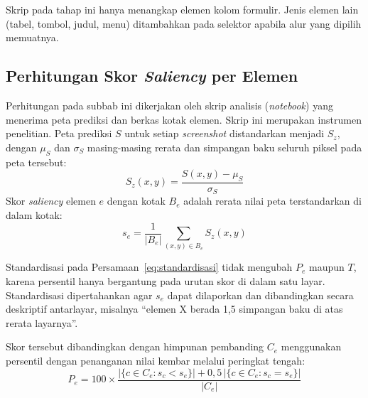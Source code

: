 Skrip pada tahap ini hanya menangkap elemen kolom formulir. Jenis elemen lain (tabel, tombol, judul, menu) ditambahkan pada selektor apabila alur yang dipilih memuatnya.

\subsection{Perhitungan Skor \emph{Saliency} per Elemen}
\label{subsec:skor}

Perhitungan pada subbab ini dikerjakan oleh skrip analisis (\emph{notebook}) yang menerima peta prediksi dan berkas kotak elemen. Skrip ini merupakan instrumen penelitian. Peta prediksi $S$ untuk setiap \emph{screenshot} distandarkan menjadi $S_z$, dengan $\mu_S$ dan $\sigma_S$ masing-masing rerata dan simpangan baku seluruh piksel pada peta tersebut:
\begin{equation}
  S_z(x,y) = \frac{S(x,y) - \mu_S}{\sigma_S}
  \label{eq:standardisasi}
\end{equation}
Skor \emph{saliency} elemen $e$ dengan kotak $B_e$ adalah rerata nilai peta terstandarkan di dalam kotak:
\begin{equation}
  s_e = \frac{1}{|B_e|}\sum_{(x,y)\in B_e} S_z(x,y)
  \label{eq:skor}
\end{equation}

Standardisasi pada Persamaan~\eqref{eq:standardisasi} tidak mengubah $P_e$ maupun $T$, karena persentil hanya bergantung pada urutan skor di dalam satu layar. Standardisasi dipertahankan agar $s_e$ dapat dilaporkan dan dibandingkan secara deskriptif antarlayar, misalnya ``elemen X berada 1,5 simpangan baku di atas rerata layarnya''.

Skor tersebut dibandingkan dengan himpunan pembanding $C_e$ menggunakan persentil dengan penanganan nilai kembar melalui peringkat tengah:
\begin{equation}
  P_e = 100 \times \frac{\left|\{c\in C_e : s_c < s_e\}\right| + 0{,}5\,\left|\{c\in C_e : s_c = s_e\}\right|}{|C_e|}
  \label{eq:persentil}
\end{equation}

